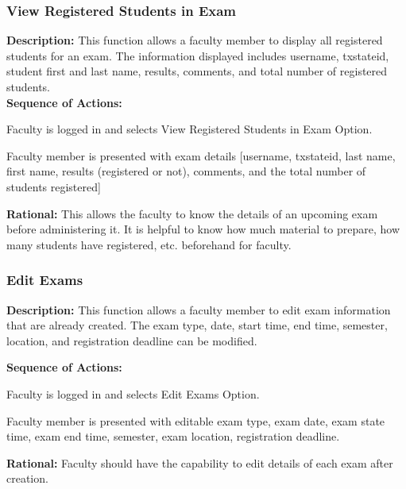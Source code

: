    \subsubsection{\large View Registered Students in Exam} 
   \begin{boxed} %
      \textbf{Description:}
      {\small This function allows a faculty member to display all registered
         students for an exam. The information displayed includes username,
         txstateid, student first and last name, results, comments, and total
      number of registered students.} \\
         
         \textbf{Sequence of Actions:}
         \begin{enumerate}
               {\small
            \item Faculty is logged in and selects View Registered Students in Exam
               Option.
            \item Faculty member is presented with exam details [username,
               txstateid, last name, first name, results (registered or not),
            comments, and the total number of students registered]}
         \end{enumerate}

         \textbf{Rational:}
         {\small This allows the faculty to know the details of an upcoming exam before
         administering it. It is helpful to know how much material to prepare,
         how many students have registered, etc. beforehand for faculty.}
   \end{boxed} %

   \subsubsection{\large Edit Exams} 
   \begin{boxed} %
      \textbf{Description:}
      {\small This function allows a faculty member to edit exam information that are already
         created. The exam type, date, start time, end time, semester,
         location, and registration deadline can be modified. }
         
         \textbf{Sequence of Actions:}
         \begin{enumerate}
               {\small
            \item Faculty is logged in and selects Edit Exams Option.
            \item Faculty member is presented with editable exam type, exam
               date, exam state time, exam end time, semester, exam location,
               registration deadline. }
         \end{enumerate}

         \textbf{Rational:}
         {\small Faculty should have the capability to edit details of each exam after
         creation.}
   \end{boxed} %

